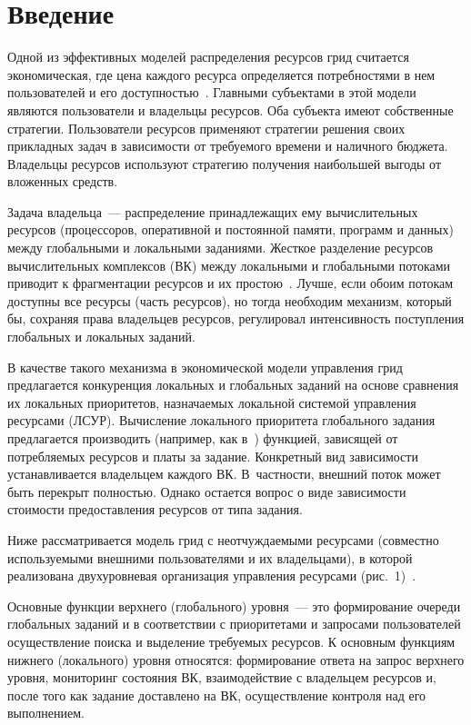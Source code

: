       \begin{multicols}{2}

      \label{st\stat}



\section{Введение}

  Одной из эффективных моделей распределения ресурсов грид считается
экономическая, где цена каждого ресурса определяется потребностями в нем
пользователей и его доступностью~\cite{1ag, 2ag}. Главными субъектами в этой
модели являются пользователи и владельцы ресурсов. Оба субъекта имеют
собственные стратегии. Пользователи ресурсов применяют стратегии решения
своих прикладных задач в зависимости от требуемого времени и наличного
бюджета. Владельцы ресурсов используют стратегию получения наибольшей
выгоды от вложенных средств.

  Задача владельца~--- распределение принадлежащих ему вычислительных
ресурсов (процессоров, оперативной и постоянной памяти, программ и данных)
между глобальными и локальными заданиями. Жесткое разделение ресурсов
вычислительных комплексов (ВК) между локальными и глобальными потоками
приводит к фрагментации ресурсов и их простою~\cite{3ag}. Лучше, если
обоим потокам доступны все ресурсы (часть ресурсов), но тогда необходим
механизм, который бы, сохраняя права владельцев ресурсов, регулировал
интенсивность поступления глобальных и локальных заданий.

  В качестве такого механизма в экономической модели управления грид
предлагается конкуренция локальных и глобальных заданий на основе
сравнения их локальных приоритетов, назначаемых локальной системой
управления ресурсами (ЛСУР). Вычисление локального приоритета
глобального задания предлагается производить (например, как в~\cite{4ag,
5ag}) функцией, зависящей от потребляемых ресурсов и платы за задание.
Конкретный вид зависимости устанавливается владельцем каждого ВК.
В~частности, внешний поток может быть перекрыт полностью. Однако
остается вопрос о виде зависимости стоимости предоставления ресурсов от
типа задания.

  Ниже рассматривается модель грид с не\-от\-чуж\-да\-емыми ресурсами (совместно
используемыми внешними пользователями и их владельцами), в которой
реализована двухуровневая организация управления ресурсами 
(рис.~1)~\cite{1ag}. 

Основные функции верхнего (глобального)
уровня~--- это формирование очереди глобальных заданий и в соответствии с
приоритетами и запросами пользователей осуществление поиска и выделение
требуемых ресурсов. 
К основным функциям нижнего (локального) уровня
относятся: формирование ответа на запрос верхнего уровня, мониторинг
состояния ВК, взаимодействие с владельцем ресурсов и, после того как задание
доставлено на ВК, осуществление контроля над его выполнением.



\end{multicols}
